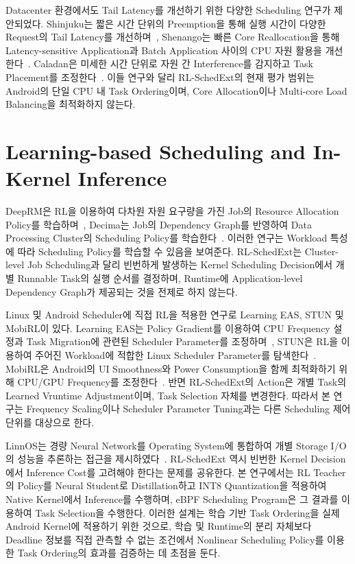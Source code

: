 Datacenter 환경에서도 Tail Latency를 개선하기 위한 다양한 Scheduling 연구가 제안되었다. Shinjuku는 짧은 시간 단위의 Preemption을 통해 실행 시간이 다양한 Request의 Tail Latency를 개선하며~\cite{shinjuku}, Shenango는 빠른 Core Reallocation을 통해 Latency-sensitive Application과 Batch Application 사이의 CPU 자원 활용을 개선한다~\cite{shenango}. Caladan은 미세한 시간 단위로 자원 간 Interference를 감지하고 Task Placement를 조정한다~\cite{caladan}. 이들 연구와 달리 RL-SchedExt의 현재 평가 범위는 Android의 단일 CPU 내 Task Ordering이며, Core Allocation이나 Multi-core Load Balancing을 최적화하지 않는다.

\section{Learning-based Scheduling and In-Kernel Inference}
\label{sec:related-learning-based-scheduling-and-in-kernel-inference}

DeepRM은 RL을 이용하여 다차원 자원 요구량을 가진 Job의 Resource Allocation Policy를 학습하며~\cite{deeprm}, Decima는 Job의 Dependency Graph를 반영하여 Data Processing Cluster의 Scheduling Policy를 학습한다~\cite{decima}. 이러한 연구는 Workload 특성에 따라 Scheduling Policy를 학습할 수 있음을 보여준다. RL-SchedExt는 Cluster-level Job Scheduling과 달리 빈번하게 발생하는 Kernel Scheduling Decision에서 개별 Runnable Task의 실행 순서를 결정하며, Runtime에 Application-level Dependency Graph가 제공되는 것을 전제로 하지 않는다.

Linux 및 Android Scheduler에 직접 RL을 적용한 연구로 Learning EAS, STUN 및 MobiRL이 있다. Learning EAS는 Policy Gradient를 이용하여 CPU Frequency 설정과 Task Migration에 관련된 Scheduler Parameter를 조정하며~\cite{han2020}, STUN은 RL을 이용하여 주어진 Workload에 적합한 Linux Scheduler Parameter를 탐색한다~\cite{stun}. MobiRL은 Android의 UI Smoothness와 Power Consumption을 함께 최적화하기 위해 CPU/GPU Frequency를 조정한다~\cite{mobirl}. 반면 RL-SchedExt의 Action은 개별 Task의 Learned Vruntime Adjustment이며, Task Selection 자체를 변경한다. 따라서 본 연구는 Frequency Scaling이나 Scheduler Parameter Tuning과는 다른 Scheduling 제어 단위를 대상으로 한다.

LinnOS는 경량 Neural Network를 Operating System에 통합하여 개별 Storage I/O의 성능을 추론하는 접근을 제시하였다~\cite{linnos}. RL-SchedExt 역시 빈번한 Kernel Decision에서 Inference Cost를 고려해야 한다는 문제를 공유한다. 본 연구에서는 RL Teacher의 Policy를 Neural Student로 Distillation하고 INT8 Quantization을 적용하여 Native Kernel에서 Inference를 수행하며, eBPF Scheduling Program은 그 결과를 이용하여 Task Selection을 수행한다. 이러한 설계는 학습 기반 Task Ordering을 실제 Android Kernel에 적용하기 위한 것으로, 학습 및 Runtime의 분리 자체보다 Deadline 정보를 직접 관측할 수 없는 조건에서 Nonlinear Scheduling Policy를 이용한 Task Ordering의 효과를 검증하는 데 초점을 둔다.
